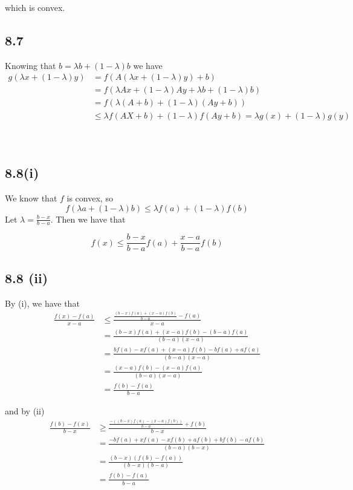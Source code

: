 \documentclass[letterpaper,12pt]{article}
\theoremstyle{definition}
\begin{document}
which is convex.

\subsection*{8.7}


Knowing that $b=\lambda b+(1-\lambda)b$ we have  \\

\begin{align*}
g(\lambda x +(1-\lambda)y) & = f(A(\lambda x +(1-\lambda) y)+b) \\
						   & = f(\lambda Ax +(1-\lambda) Ay +\lambda b + (1-\lambda) b ) \\
						   & = f( \lambda (A+b) +(1-\lambda ) (Ay+b) ) \\
						   & \leq \lambda f(AX+b) + (1-\lambda) f(Ay+b) 
						    = \lambda g(x) +(1-\lambda) g(y) 
\end{align*} \\ \\ 



\subsection*{8.8(i)}
We know that $f$ is convex, so 
\[ f(\lambda a + (1-\lambda)b) \leq \lambda f(a) + (1-\lambda)f(b) \] 
Let $\lambda = \frac{b-x}{b-a}$. Then we have that 

\[f(x) \leq \frac{b-x}{b-a}f(a) + \frac{x-a}{b-a}f(b) \]

\subsection*{8.8 (ii)}



By (i), we have that 
\begin{align*}
\frac{f(x)-f(a)}{x-a} &\leq \frac{\frac{(b-x)f(a)+(x-a)f(b)}{b-a}-f(a)}{x-a} \\
 &= \frac{(b-x)f(a)+(x-a)f(b)-(b-a)f(a)}{(b-a)(x-a)}\\ 
 &= \frac{bf(a)-xf(a)+(x-a)f(b)-bf(a)+af(a)}{(b-a)(x-a)} \\
 &= \frac{(x-a)f(b)-(x-a)f(a)}{(b-a)(x-a)}\\ 
 &= \frac{f(b)-f(a)}{b-a} 
\end{align*}

and by (ii)
\begin{align*}
 \frac{f(b)-f(x)}{b-x} &\geq \frac{\frac{-((b-x)f(a)-(x-a)f(b))}{b-a} + f(b)}{b-x} \\
 &= \frac{-bf(a)+xf(a)-xf(b)+af(b)+bf(b)-af(b)}{(b-a)(b-x)} \\
 &= \frac{(b-x)(f(b)-f(a))}{(b-x)(b-a)}\\ 
 &= \frac{f(b)-f(a)}{b-a} 
\end{align*}
\end{document}
